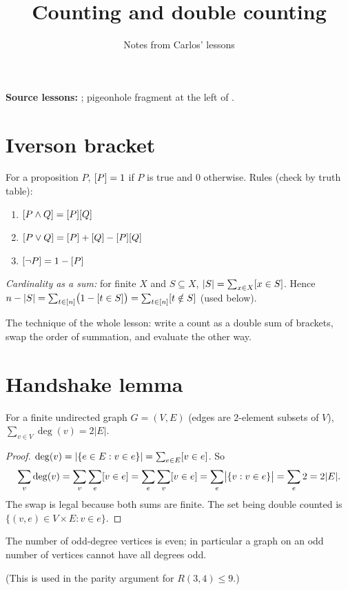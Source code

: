 \documentclass[11pt]{article}
\title{Counting and double counting}
\author{Notes from Carlos' lessons}
\date{}
\begin{document}
\maketitle

\textbf{Source lessons:} ;
pigeonhole fragment at the left of .

\section*{Iverson bracket}

For a proposition $P$, $[P]=1$ if $P$ is true and $0$ otherwise. Rules (check by truth table):
\begin{enumerate}[nosep]
  \item $[P\wedge Q]=[P][Q]$
  \item $[P\vee Q]=[P]+[Q]-[P][Q]$
  \item $[\neg P]=1-[P]$
\end{enumerate}

\emph{Cardinality as a sum:} for finite $X$ and $S\subseteq X$, $|S|=\sum_{x\in X}[x\in S]$.
Hence $n-|S|=\sum_{t\in[n]}\bigl(1-[t\in S]\bigr)=\sum_{t\in[n]}[t\notin S]$ (used below).

The technique of the whole lesson: write a count as a double sum of brackets, swap the order of summation, and evaluate the other way.

\section*{Handshake lemma}

\begin{theorem}
For a finite undirected graph $G=(V,E)$ (edges are $2$-element subsets of $V$),
$\displaystyle\sum_{v\in V}\deg(v)=2|E|$.
\end{theorem}
\begin{proof}
$\deg(v)=|\{e\in E: v\in e\}|=\sum_{e\in E}[v\in e]$. So
\[
\sum_{v}\deg(v)=\sum_{v}\sum_{e}[v\in e]=\sum_{e}\sum_{v}[v\in e]
=\sum_{e}\bigl|\{v: v\in e\}\bigr|=\sum_{e}2=2|E|.
\]
The swap is legal because both sums are finite. The set being double counted is $\{(v,e)\in V\times E: v\in e\}$.
\end{proof}

\begin{corollary}
The number of odd-degree vertices is even; in particular a graph on an odd number of vertices cannot have all degrees odd.
\end{corollary}
(This is used in the parity argument for $R(3,4)\le 9$.)
\end{document}
